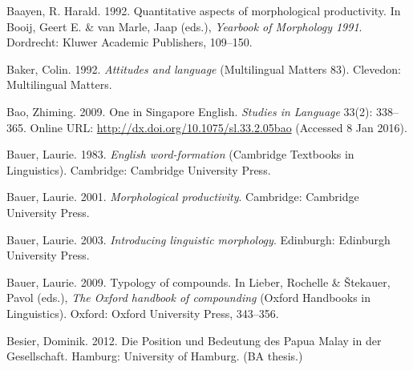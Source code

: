 \begin{styleCitaviBibliographyEntry}
Baayen, R. Harald. 1992. Quantitative aspects of morphological productivity. In Booij, Geert E. \& van Marle, Jaap (eds.), \textit{Yearbook of Morphology 1991}. Dordrecht: Kluwer Academic Publishers, 109–150.
\end{styleCitaviBibliographyEntry}

\begin{styleCitaviBibliographyEntry}
Baker, Colin. 1992. \textit{Attitudes and language} (Multilingual Matters 83). Clevedon: Multilingual Matters.
\end{styleCitaviBibliographyEntry}

\begin{styleCitaviBibliographyEntry}
Bao, Zhiming. 2009. One in Singapore English. \textit{Studies in Language} 33(2): 338–365. Online URL: \url{http://dx.doi.org/10.1075/sl.33.2.05bao} (Accessed 8 Jan 2016).
\end{styleCitaviBibliographyEntry}

\begin{styleCitaviBibliographyEntry}
Bauer, Laurie. 1983. \textit{English word-formation} (Cambridge Textbooks in Linguistics). Cambridge: Cambridge University Press.
\end{styleCitaviBibliographyEntry}

\begin{styleCitaviBibliographyEntry}
Bauer, Laurie. 2001. \textit{Morphological productivity}. Cambridge: Cambridge University Press.
\end{styleCitaviBibliographyEntry}

\begin{styleCitaviBibliographyEntry}
Bauer, Laurie. 2003. \textit{Introducing linguistic morphology}. Edinburgh: Edinburgh University Press.
\end{styleCitaviBibliographyEntry}

\begin{styleCitaviBibliographyEntry}
Bauer, Laurie. 2009. Typology of compounds. In Lieber, Rochelle \& Štekauer, Pavol (eds.), \textit{The Oxford handbook of compounding} (Oxford Handbooks in Linguistics). Oxford: Oxford University Press, 343–356.
\end{styleCitaviBibliographyEntry}

\begin{styleCitaviBibliographyEntry}
Besier, Dominik. 2012. Die Position und Bedeutung des Papua Malay in der Gesellschaft. Hamburg: University of Hamburg. (BA thesis.)
\end{styleCitaviBibliographyEntry}

